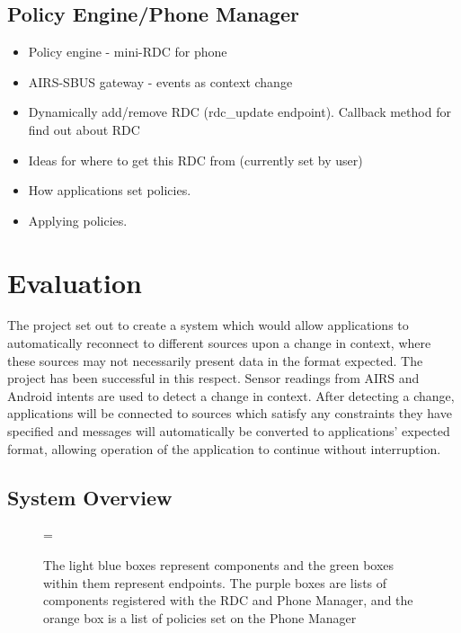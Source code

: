 \documentclass[12pt,twoside,notitlepage]{report}
\begin{document}
\section{Policy Engine/Phone Manager}

\begin{itemize}

\item Policy engine - mini-RDC for phone

\item AIRS-SBUS gateway - events as context change

\item Dynamically add/remove RDC (rdc\_update endpoint). Callback method for find out about RDC

\item Ideas for where to get this RDC from (currently set by user)

\item How applications set policies.

\item Applying policies.

\end{itemize}

\cleardoublepage


\chapter{Evaluation}

The project set out to create a system which would allow applications to automatically reconnect to different sources upon a change in context, where these sources may not necessarily present data in the format expected. 
The project has been successful in this respect. Sensor readings from AIRS and Android intents are used to detect a change in context. After detecting a change, applications will be connected to sources which satisfy any constraints they have specified and messages will automatically be converted to applications' expected format, allowing operation of the application to continue without interruption.

\section{System Overview}

\begin{figure}[tbh]
\epsfxsize=\hsize
\centerline{}
\caption[System Overview]{The light blue boxes represent components and the green boxes within them represent endpoints. The purple boxes are lists of components registered with the RDC and Phone Manager, and the orange box is a list of policies set on the Phone Manager}
\label{fig:system_overview}
\end{figure}
\end{document}
